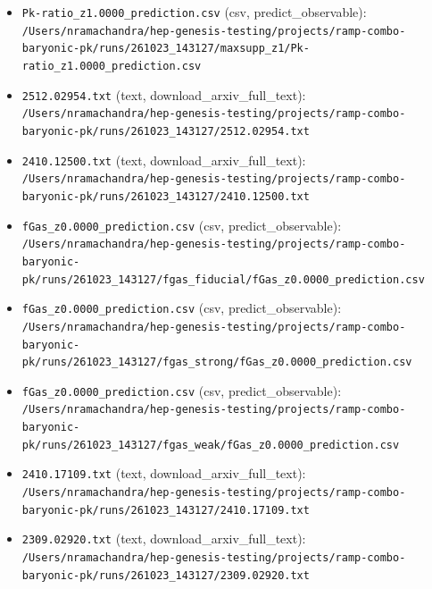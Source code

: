 \documentclass[11pt,a4paper]{article}
\begin{document}
\begin{itemize}
  \item \texttt{Pk-ratio\_\allowbreak{}z1.0000\_\allowbreak{}prediction.csv} (csv, predict\_observable): \texttt{/\allowbreak{}Users/\allowbreak{}nramachandra/\allowbreak{}hep-genesis-testing/\allowbreak{}projects/\allowbreak{}ramp-combo-baryonic-pk/\allowbreak{}runs/\allowbreak{}261023\_\allowbreak{}143127/\allowbreak{}maxsupp\_\allowbreak{}z1/\allowbreak{}Pk-ratio\_\allowbreak{}z1.0000\_\allowbreak{}prediction.csv}
  \item \texttt{2512.02954.txt} (text, download\_arxiv\_full\_text): \texttt{/\allowbreak{}Users/\allowbreak{}nramachandra/\allowbreak{}hep-genesis-testing/\allowbreak{}projects/\allowbreak{}ramp-combo-baryonic-pk/\allowbreak{}runs/\allowbreak{}261023\_\allowbreak{}143127/\allowbreak{}2512.02954.txt}
  \item \texttt{2410.12500.txt} (text, download\_arxiv\_full\_text): \texttt{/\allowbreak{}Users/\allowbreak{}nramachandra/\allowbreak{}hep-genesis-testing/\allowbreak{}projects/\allowbreak{}ramp-combo-baryonic-pk/\allowbreak{}runs/\allowbreak{}261023\_\allowbreak{}143127/\allowbreak{}2410.12500.txt}
  \item \texttt{fGas\_\allowbreak{}z0.0000\_\allowbreak{}prediction.csv} (csv, predict\_observable): \texttt{/\allowbreak{}Users/\allowbreak{}nramachandra/\allowbreak{}hep-genesis-testing/\allowbreak{}projects/\allowbreak{}ramp-combo-baryonic-pk/\allowbreak{}runs/\allowbreak{}261023\_\allowbreak{}143127/\allowbreak{}fgas\_\allowbreak{}fiducial/\allowbreak{}fGas\_\allowbreak{}z0.0000\_\allowbreak{}prediction.csv}
  \item \texttt{fGas\_\allowbreak{}z0.0000\_\allowbreak{}prediction.csv} (csv, predict\_observable): \texttt{/\allowbreak{}Users/\allowbreak{}nramachandra/\allowbreak{}hep-genesis-testing/\allowbreak{}projects/\allowbreak{}ramp-combo-baryonic-pk/\allowbreak{}runs/\allowbreak{}261023\_\allowbreak{}143127/\allowbreak{}fgas\_\allowbreak{}strong/\allowbreak{}fGas\_\allowbreak{}z0.0000\_\allowbreak{}prediction.csv}
  \item \texttt{fGas\_\allowbreak{}z0.0000\_\allowbreak{}prediction.csv} (csv, predict\_observable): \texttt{/\allowbreak{}Users/\allowbreak{}nramachandra/\allowbreak{}hep-genesis-testing/\allowbreak{}projects/\allowbreak{}ramp-combo-baryonic-pk/\allowbreak{}runs/\allowbreak{}261023\_\allowbreak{}143127/\allowbreak{}fgas\_\allowbreak{}weak/\allowbreak{}fGas\_\allowbreak{}z0.0000\_\allowbreak{}prediction.csv}
  \item \texttt{2410.17109.txt} (text, download\_arxiv\_full\_text): \texttt{/\allowbreak{}Users/\allowbreak{}nramachandra/\allowbreak{}hep-genesis-testing/\allowbreak{}projects/\allowbreak{}ramp-combo-baryonic-pk/\allowbreak{}runs/\allowbreak{}261023\_\allowbreak{}143127/\allowbreak{}2410.17109.txt}
  \item \texttt{2309.02920.txt} (text, download\_arxiv\_full\_text): \texttt{/\allowbreak{}Users/\allowbreak{}nramachandra/\allowbreak{}hep-genesis-testing/\allowbreak{}projects/\allowbreak{}ramp-combo-baryonic-pk/\allowbreak{}runs/\allowbreak{}261023\_\allowbreak{}143127/\allowbreak{}2309.02920.txt}
\end{itemize}
\end{document}
